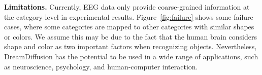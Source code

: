 \documentclass[10pt,twocolumn,letterpaper]{article}
\begin{document}
\noindent\textbf{Limitations.} Currently, EEG data only provide coarse-grained information at the category level in experimental results. Figure~\ref{fig:failure} shows some failure cases, where some categories are mapped to other categories with similar shapes or colors. We assume this may be due to the fact that the human brain considers shape and color as two important factors when recognizing objects. Nevertheless, DreamDiffusion has the potential to be used in a wide range of applications, such as neuroscience, psychology, and human-computer interaction.

{\small


}
\end{document}
